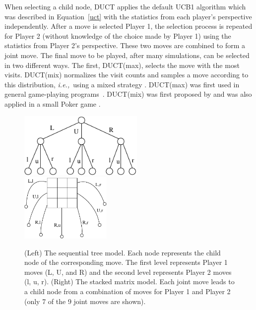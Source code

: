 \documentclass{article}
\newcommand{\ie}{{\it i.e.,}~}
\begin{document}
When selecting a child node, DUCT applies the default UCB1 algorithm which was described in Equation~\ref{uct} with the statistics from each player's perspective independently. After a move is selected Player 1, the selection process is repeated for Player 2 (without knowledge of the choice made by Player 1) using the statistics from Player 2's perspective. These two moves are combined to form a joint move.
The final move to be played, after many simulations, can be selected in two different ways. The first, DUCT(max), selects the move with the most visits. 
DUCT(mix) normalizes the visit counts and samples a move according to this distribution, \ie using a mixed strategy \cite{mcts_goofspiel}. 
DUCT(max) was first used in general game-playing programs~\cite{finnson_master}. DUCT(mix) was first proposed by \cite{Shafiei09} and was also applied 
in a small Poker game \cite{Ponsen11Computing}. 

\begin{figure}
\begin{center}
\includegraphics[width=6cm]{seq-model.pdf}~~~~~~~~~~~~~~~\includegraphics[width=4.4cm]{mat-model.pdf}
\caption{(Left) The sequential tree model. Each node represents the child node of the corresponding move. The first level represents Player 1 moves (L, U, and R) and the second level represents Player 2 moves (l, u, r). 
(Right) The stacked matrix model. Each joint move leads to a child node from a combination of moves for Player 1 and Player 2 (only 7 of the 9 joint moves are shown).
\label{fig:suct_vs_duct}}
\end{center}
\end{figure}
\end{document}
